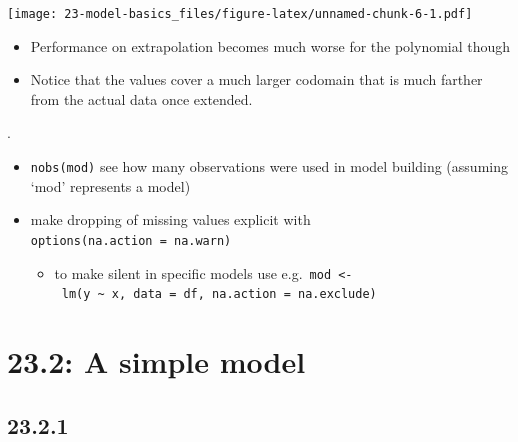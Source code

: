 \documentclass[]{book}
\providecommand{\tightlist}{%
  \setlength{\itemsep}{0pt}\setlength{\parskip}{0pt}}
\theoremstyle{definition}
\theoremstyle{definition}
\theoremstyle{definition}
\theoremstyle{remark}
\begin{document}
\begin{itemize}
{    \texttt{[image: 23-model-basics\_files/figure-latex/unnamed-chunk-6-1.pdf]}

    \begin{itemize}
    \tightlist
    \item
      Performance on extrapolation becomes much worse for the polynomial
      though
    \item
      Notice that the values cover a much larger codomain that is much
      farther from the actual data once extended.
    \end{itemize}}.
\end{itemize}

\begin{itemize}
\tightlist
\item
  \texttt{nobs(mod)} see how many observations were used in model
  building (assuming `mod' represents a model)
\item
  make dropping of missing values explicit with
  \texttt{options(na.action\ =\ na.warn)}

  \begin{itemize}
  \tightlist
  \item
    to make silent in specific models use
    e.g.~\texttt{mod\ \textless{}-\ lm(y\ \textasciitilde{}\ x,\ data\ =\ df,\ na.action\ =\ na.exclude)}
  \end{itemize}
\end{itemize}

\hypertarget{a-simple-model}{%
\section{23.2: A simple model}\label{a-simple-model}}

\hypertarget{section-78}{%
\subsection{23.2.1}\label{section-78}}
\end{document}
